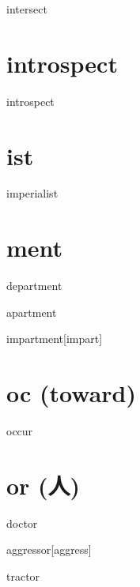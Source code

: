 \begin{wordRef}{intersect}
\end{wordRef}

\section{introspect}

\begin{wordRef}{introspect}
\end{wordRef}

\section{ist}

\begin{wordRef}{imperialist}
\end{wordRef}


\section{ment}

\begin{wordRef}{department}
\end{wordRef}

\begin{wordRef}{apartment}
\end{wordRef}

\begin{wordRef}{impartment}[impart]
\end{wordRef}


\section{oc (toward)}

\begin{wordRef}{occur}
\end{wordRef}

\section{or (人)}


\begin{wordRef}{doctor}
\end{wordRef}

\begin{wordRef}{aggressor}[aggress]
\end{wordRef}

\begin{wordRef}{tractor}
\end{wordRef}


